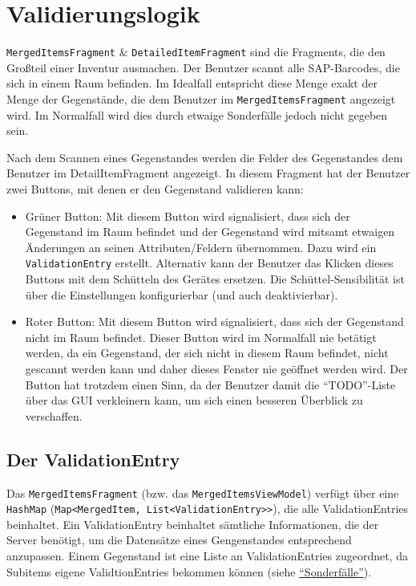 \hypertarget{validierungslogik}{%
\section{Validierungslogik}\label{validierungslogik}}

\texttt{MergedItemsFragment} \& \texttt{DetailedItemFragment} sind die
Fragments, die den Großteil einer Inventur ausmachen. Der Benutzer
scannt alle SAP-Barcodes, die sich in einem Raum befinden. Im Idealfall
entspricht diese Menge exakt der Menge der Gegenstände, die dem Benutzer
im \texttt{MergedItemsFragment} angezeigt wird. Im Normalfall wird dies
durch etwaige Sonderfälle jedoch nicht gegeben sein.

Nach dem Scannen eines Gegenstandes werden die Felder des Gegenstandes
dem Benutzer im DetailItemFragment angezeigt. In diesem Fragment hat der
Benutzer zwei Buttons, mit denen er den Gegenstand validieren kann:

\begin{itemize}
\tightlist
\item
  Grüner Button: Mit diesem Button wird signalisiert, dass sich der
  Gegenstand im Raum befindet und der Gegenstand wird mitsamt etwaigen
  Änderungen an seinen Attributen/Feldern übernommen. Dazu wird ein
  \texttt{ValidationEntry} erstellt. Alternativ kann der Benutzer das
  Klicken dieses Buttons mit dem Schütteln des Gerätes ersetzen. Die
  Schüttel-Sensibilität ist über die Einstellungen konfigurierbar (und
  auch deaktivierbar).
\item
  Roter Button: Mit diesem Button wird signalisiert, dass sich der
  Gegenstand nicht im Raum befindet. Dieser Button wird im Normalfall
  nie betätigt werden, da ein Gegenstand, der sich nicht in diesem Raum
  befindet, nicht gescannt werden kann und daher dieses Fenster nie
  geöffnet werden wird. Der Button hat trotzdem einen Sinn, da der
  Benutzer damit die ``TODO''-Liste über das GUI verkleinern kann, um
  sich einen besseren Überblick zu verschaffen.
\end{itemize}

\hypertarget{der-validationentry}{%
\subsection{Der ValidationEntry}\label{der-validationentry}}

Das \texttt{MergedItemsFragment} (bzw. das
\texttt{MergedItemsViewModel}) verfügt über eine \texttt{HashMap}
(\texttt{Map\textless{}MergedItem,\ List\textless{}ValidationEntry\textgreater{}\textgreater{}}),
die alle ValidationEntries beinhaltet. Ein ValidationEntry beinhaltet
sämtliche Informationen, die der Server benötigt, um die Datensätze
eines Gengenstandes entsprechend anzupassen. Einem Gegenstand ist eine
Liste an ValidationEntries zugeordnet, da Subitems eigene
ValidtionEntries bekommen können (siehe
\protect\hyperlink{sonderfuxe4lle}{``Sonderfälle''}).

